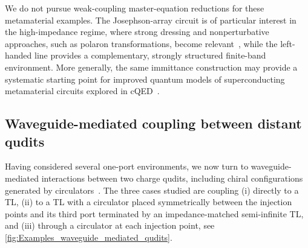 \documentclass[prx,aps,twocolumn,article]{revtex4-2}
\begin{document}
We do not pursue weak-coupling master-equation reductions for these metamaterial examples. The Josephson-array circuit is of particular interest in the high-impedance regime, where strong dressing and nonperturbative approaches, such as polaron transformations, become relevant~\cite{Bera:2014,Snyman:2015}, while the left-handed line provides a complementary, strongly structured finite-band environment. More generally, the same immittance construction may provide a systematic
starting point for improved quantum models of superconducting metamaterial circuits explored in \gls{cQED}~\cite{Zueco:2012,PuertasMartinez:2019,
Indrajeet:2020}.

\subsection{Waveguide-mediated coupling between distant qudits}
\label{Sec:TwoPortExamples}

Having considered several one-port environments, we now turn to waveguide-mediated interactions between two charge qudits, including chiral configurations~\cite{lodahl:2017} generated by circulators~\cite{Viola:2014,Kerckhoff:2015,Chapman:2017,Barzanjeh:2017}. The three cases studied are coupling (i) directly to a \gls{TL}, (ii) to a \gls{TL} with a circulator placed symmetrically between the injection points and its third port terminated by an impedance-matched semi-infinite \gls{TL}, and (iii) through a circulator at each injection point, see
\cref{fig:Examples_waveguide_mediated_qudits}.
\end{document}
